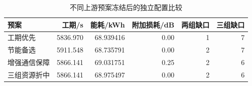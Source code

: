 \begin{table}[htbp]\centering\small
\caption{不同上游预案冻结后的独立配置比较}\label{tab:q4_crossplans}
\begin{tabular}{@{}lrrrrr@{}}
\toprule
预案 & 工期/s & 能耗/kWh & 附加损耗/dB & 两组缺口 & 三组缺口\\
\midrule
工期优先 & 5836.970 & 68.939416 & 0.00 & 1 & 7\\
节能备选 & 5911.548 & 68.735791 & 0.00 & 2 & 7\\
增强通信保障 & 5866.141 & 69.031751 & 0.25 & 2 & 6\\
三组资源折中 & 5866.141 & 68.975497 & 0.00 & 2 & 6\\
\bottomrule
\end{tabular}
\end{table}
